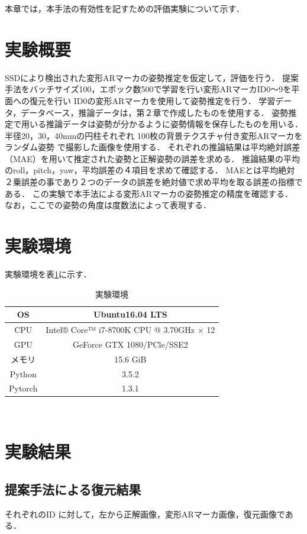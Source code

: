 本章では，本手法の有効性を記すための評価実験について示す．

\section{実験概要}
SSDにより検出された変形ARマーカの姿勢推定を仮定して，評価を行う．
提案手法をバッチサイズ100，エポック数500で学習を行い変形ARマーカID0～9を平面への復元を行い
ID0の変形ARマーカを使用して姿勢推定を行う．
学習データ，データベース，推論データは，第２章で作成したものを使用する．
姿勢推定で用いる推論データは姿勢が分かるように姿勢情報を保存したものを用いる．
半径20，30，40mmの円柱それぞれ
100枚の背景テクスチャ付き変形ARマーカをランダム姿勢
で撮影した画像を使用する．
それぞれの推論結果は平均絶対誤差（MAE）を用いて推定された姿勢と正解姿勢の誤差を求める．
推論結果の平均のroll，pitch，yaw，平均誤差の４項目を求めて確認する．
MAEとは平均絶対２乗誤差の事であり２つのデータの誤差を絶対値で求め平均を取る誤差の指標である．
この実験で本手法による変形ARマーカの姿勢推定の精度を確認する．
なお，ここでの姿勢の角度は度数法によって表現する．

\newpage

\section{実験環境}
実験環境を表\ref{tab:kankyo}に示す．

\begin{table}[h]
  \centering
  \caption{実験環境}
    \begin{tabular}{c||c} \hline
    	OS & Ubuntu16.04 LTS \\ \hline
    	CPU &  Intel® Core™ i7-8700K CPU @ 3.70GHz × 12 \\ \hline
    	GPU & GeForce GTX 1080/PCle/SSE2 \\ \hline
     メモリ & 15.6 GiB \\ \hline
    	Python & 3.5.2 \\ \hline
    	Pytorch & 1.3.1 \\ \hline
  \end{tabular}
　\label{tab:kankyo}
\end{table}


\section{実験結果}

\subsection{提案手法による復元結果}
それぞれのID に対して，左から正解画像，変形ARマーカ画像，復元画像である．

